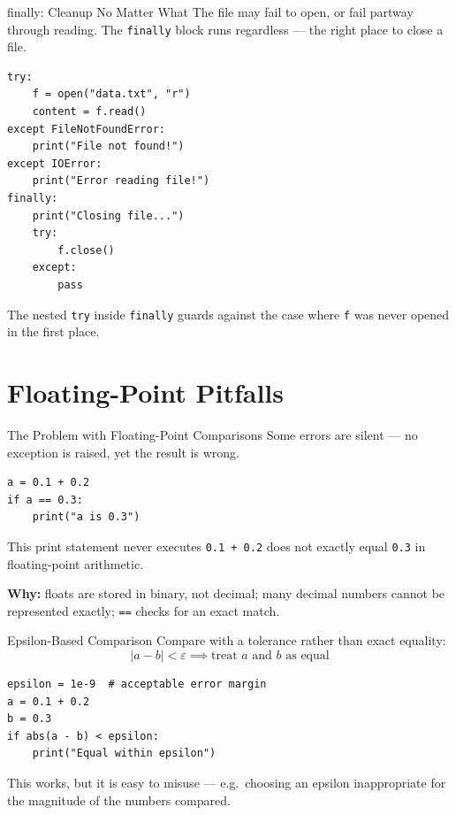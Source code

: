 \documentclass[9pt,aspectratio=169,xcolor=table]{beamer}
\begin{document}
\begin{frame}[fragile]{finally: Cleanup No Matter What}
    \leavevmode
    The file may fail to open, or fail partway through reading. The
    \texttt{finally} block runs regardless --- the right place to close
    a file.

\begin{lstlisting}
try:
    f = open("data.txt", "r")
    content = f.read()
except FileNotFoundError:
    print("File not found!")
except IOError:
    print("Error reading file!")
finally:
    print("Closing file...")
    try:
        f.close()
    except:
        pass
\end{lstlisting}

    {\scriptsize The nested \texttt{try} inside \texttt{finally} guards
    against the case where \texttt{f} was never opened in the first
    place.}
\end{frame}

\section{Floating-Point Pitfalls}

\begin{frame}[fragile]{The Problem with Floating-Point Comparisons}
    \leavevmode
    Some errors are silent --- no exception is raised, yet the result
    is wrong.

\begin{lstlisting}
a = 0.1 + 0.2
if a == 0.3:
    print("a is 0.3")
\end{lstlisting}

    \vspace{1mm}
    \begin{alertblock}{This print statement never executes}
        \texttt{0.1 + 0.2} does not exactly equal \texttt{0.3} in
        floating-point arithmetic.
    \end{alertblock}

    \vspace{2mm}
    \textbf{Why:} floats are stored in binary, not decimal; many
    decimal numbers cannot be represented exactly; \texttt{==} checks
    for an \alert{exact} match.
\end{frame}

\begin{frame}[fragile]{Epsilon-Based Comparison}
    \leavevmode
    Compare with a \alert{tolerance} rather than exact equality:
    \[
    |a - b| < \varepsilon \implies \text{treat } a \text{ and } b
    \text{ as equal}
    \]

\begin{lstlisting}
epsilon = 1e-9  # acceptable error margin
a = 0.1 + 0.2
b = 0.3
if abs(a - b) < epsilon:
    print("Equal within epsilon")
\end{lstlisting}

    \vspace{2mm}
    {\small This works, but it is easy to misuse --- e.g.\ choosing an
    epsilon inappropriate for the magnitude of the numbers compared.}
\end{frame}
\end{document}
